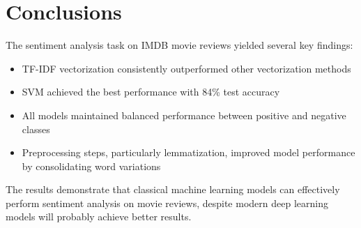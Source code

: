 \documentclass[12pt]{article}
\begin{document}
\section{Conclusions}
The sentiment analysis task on IMDB movie reviews yielded several key findings:
\begin{itemize}
    \item TF-IDF vectorization consistently outperformed other vectorization methods
    \item SVM achieved the best performance with 84\% test accuracy
    \item All models maintained balanced performance between positive and negative classes
    \item Preprocessing steps, particularly lemmatization, improved model performance by consolidating word variations
\end{itemize}

The results demonstrate that classical machine learning models can effectively perform sentiment analysis on movie reviews, despite modern deep learning models will probably achieve better results.


\end{document}
